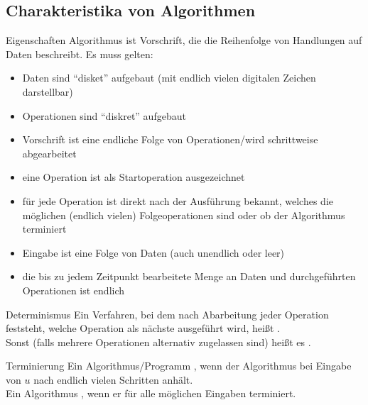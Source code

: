 \subsection{%
    Charakteristika von Algorithmen%
}

\begin{Def}{Eigenschaften}
    Algorithmus ist Vorschrift, die die Reihenfolge von Handlungen auf Daten
    beschreibt. Es muss gelten:
    \begin{itemize}
        \item Daten sind "`disket"' aufgebaut (mit endlich vielen
        digitalen Zeichen darstellbar)
        
        \item Operationen sind "`diskret"' aufgebaut
        
        \item Vorschrift ist eine endliche Folge von Operationen/wird
        schrittweise abgearbeitet
        
        \item eine Operation ist als Startoperation ausgezeichnet
        
        \item für jede Operation ist direkt nach der Ausführung bekannt,
        welches die möglichen (endlich vielen) Folgeoperationen sind oder ob
        der Algorithmus terminiert
        
        \item Eingabe ist eine Folge von Daten (auch unendlich oder leer)
        
        \item die bis zu jedem Zeitpunkt bearbeitete Menge an Daten
        und durchgeführten Operationen ist endlich
    \end{itemize}
\end{Def}

\begin{Def}{Determinismus}
    Ein Verfahren, bei dem nach Abarbeitung jeder Operation feststeht, welche
    Operation als nächste ausgeführt wird, heißt . \\
    Sonst (falls mehrere Operationen alternativ zugelassen sind) heißt es
    .
\end{Def}

\begin{Def}{Terminierung}
    Ein Algorithmus/Programm ,
    wenn der Algorithmus bei Eingabe von $u$ nach endlich vielen Schritten
    anhält. \\
    Ein Algorithmus , wenn er für alle möglichen
    Eingaben terminiert.
\end{Def}


